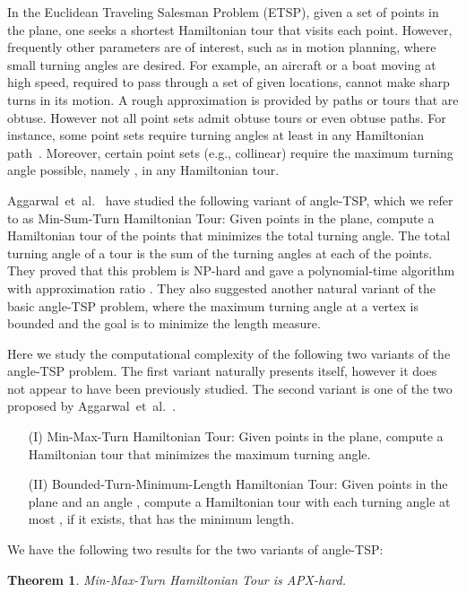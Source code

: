 \documentclass[letterpaper,11pt]{article}
\newtheorem{theorem}{Theorem}
\def\etal{{et~al.}}
\def\eg{{e.g.}}
\begin{document}
In the {\sc Euclidean Traveling Salesman Problem} (ETSP),
given a set  of  points in the plane,
one seeks a shortest Hamiltonian tour that visits each point.
However, frequently other parameters are of interest,
such as in motion planning, where small turning angles are desired.
For example, an aircraft or a boat moving at high speed,
required to pass through a set of given locations,
cannot make sharp turns in its
motion\cite{ACKMS99,ART95,BCL94,Fr89,JC89,LFF07}. 
A rough approximation is provided by paths or tours that are obtuse.
However not all point sets admit obtuse tours or even obtuse paths.
For instance, some point sets require turning angles
at least  in any Hamiltonian path~\cite{FW97}.
Moreover, certain point sets (\eg, collinear)
require the maximum turning angle possible, namely ,
in any Hamiltonian tour.

Aggarwal~\etal~\cite{ACKMS99} have studied the following variant of angle-TSP,
which we refer to as {\sc Min-Sum-Turn Hamiltonian Tour}:
Given  points in the plane,
compute a Hamiltonian tour of the points
that minimizes the total turning angle.
The total turning angle of a tour is the sum of the turning
angles at each of the  points.
They proved that this problem is NP-hard and gave a polynomial-time algorithm
with approximation ratio .
They also suggested another natural variant of the basic angle-TSP problem,
where the maximum turning angle at a vertex is bounded and the goal is
to minimize the length measure.

Here we study the computational complexity
of the following two variants of the angle-TSP problem.
The first variant naturally presents itself, however it does not
appear to have been previously studied.
The second variant is one of the two proposed by Aggarwal~\etal~\cite{ACKMS99}.
\begin{itemize} \itemsep -1pt
\item[(I)]
{\sc Min-Max-Turn Hamiltonian Tour}:
Given  points in the plane,
compute a Hamiltonian tour that minimizes the maximum turning angle.
\item[(II)]
{\sc Bounded-Turn-Minimum-Length Hamiltonian Tour}:
Given  points in the plane and an angle ,
compute a Hamiltonian tour with each turning angle at most ,
if it exists, that has the minimum length.
\end{itemize}


We have the following two results for the two variants of angle-TSP:

\begin{theorem}\label{thm:hamiltonian}
{\sc Min-Max-Turn Hamiltonian Tour} is APX-hard.
\end{theorem}
\end{document}
